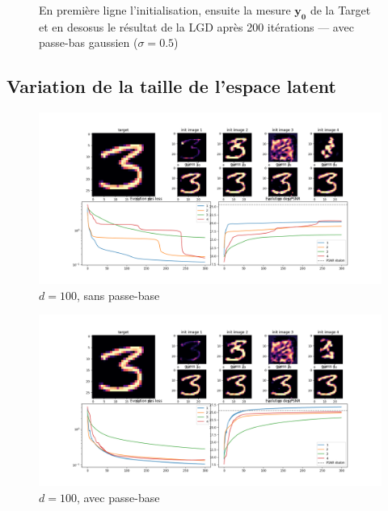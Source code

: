 \documentclass[hidelinks, french]{article} %
\renewcommand{\bf}[1]{\boldsymbol{#1}}
\theoremstyle{enonce}
\theoremstyle{special}
\theoremstyle{rq}
\theoremstyle{exo}
\theoremstyle{demo}
\begin{document}
\begin{figure}[H]\centering
	
    \caption{En première ligne l'initialisation, ensuite la mesure $\bf{y_0}$ de la Target et en desosus le résultat de la LGD après 200 itérations ---  avec passe-bas gaussien ($\sigma=0.5$)}
	\label{fig:LGD comp_inits g}
\end{figure}



\subsection{Variation de la taille de l'espace latent}

\begin{figure}[H]\centering
    \includegraphics[width=1\textwidth]{../resultats/LGD/differents latents/lat-s_100_fig.png}
    \caption{$d=100$, sans passe-base}
    \label{fig:LGD comp_size g}
\end{figure}

\begin{figure}[H]\centering
	\includegraphics[width=1\textwidth]{../resultats/LGD/differents latents/lat-g_100_fig.png}
	\caption{$d=100$, avec passe-base}
	\label{fig:LGD comp_size g}
\end{figure}
\end{document}
